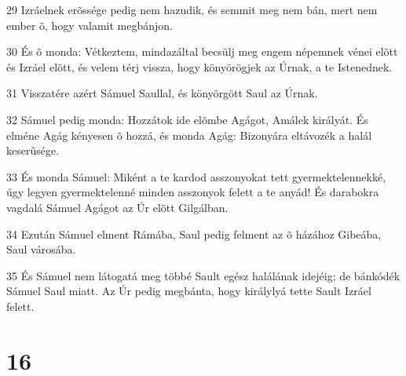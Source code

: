 \par 29 Izráelnek erõssége pedig nem hazudik, és semmit meg nem bán, mert nem ember õ, hogy valamit megbánjon.
\par 30 És õ monda: Vétkeztem, mindazáltal becsülj meg engem népemnek vénei elõtt és Izráel elõtt, és velem térj vissza, hogy könyörögjek az Úrnak, a te Istenednek.
\par 31 Visszatére azért Sámuel Saullal, és könyörgött Saul az Úrnak.
\par 32 Sámuel pedig monda: Hozzátok ide elõmbe Agágot, Amálek királyát. És elméne Agág kényesen õ hozzá, és monda Agág: Bizonyára eltávozék a halál keserûsége.
\par 33 És monda Sámuel: Miként a te kardod asszonyokat tett gyermektelennekké, úgy legyen gyermektelenné minden asszonyok felett a te anyád! És darabokra vagdalá Sámuel Agágot az Úr elõtt Gilgálban.
\par 34 Ezután Sámuel elment Rámába, Saul pedig felment az õ házához Gibeába, Saul városába.
\par 35 És Sámuel nem látogatá meg többé Sault egész halálának idejéig; de bánkódék Sámuel Saul miatt. Az Úr pedig megbánta, hogy királylyá tette Sault Izráel felett.

\chapter{16}

